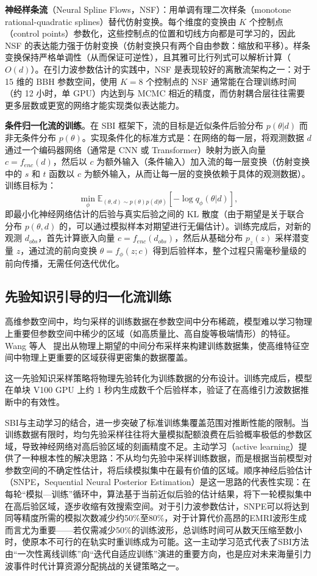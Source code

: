 \textbf{神经样条流}（Neural Spline Flows，NSF）：用单调有理二次样条（monotone rational-quadratic splines）替代仿射变换。每个维度的变换由 $K$ 个控制点（control points）参数化，这些控制点的位置和切线方向都是可学习的，因此 NSF 的表达能力强于仿射变换（仿射变换只有两个自由参数：缩放和平移）。样条变换保持严格单调性（从而保证可逆性），且其雅可比行列式可以解析计算（$O(d)$）。在引力波参数估计的实践中，NSF 是表现较好的离散流架构之一：对于 15 维的 BBH 参数空间，使用 $K = 8$ 个控制点的 NSF 通常能在合理训练时间（约 12 小时，单 GPU）内达到与 MCMC 相近的精度，而仿射耦合层往往需要更多层数或更宽的网络才能实现类似表达能力。

\textbf{条件归一化流的训练}。在 SBI 框架下，流的目标是近似条件后验分布 $p(\theta|d)$ 而非无条件分布 $p(\theta)$。实现条件化的标准方式是：在网络的每一层，将观测数据 $d$ 通过一个编码器网络（通常是 CNN 或 Transformer）映射为嵌入向量 $c = f_{enc}(d)$，然后以 $c$ 为额外输入（条件输入）加入流的每一层变换（仿射变换中的 $s$ 和 $t$ 函数以 $c$ 为额外输入，从而让每一层的变换依赖于具体的观测数据）。训练目标为：
\begin{equation}
  \min_\phi \mathbb{E}_{(\theta, d) \sim p(\theta)p(d|\theta)} [-\log q_\phi(\theta|d)],
\end{equation}
即最小化神经网络估计的后验与真实后验之间的 KL 散度（由于期望是关于联合分布 $p(\theta, d)$ 的，可以通过模拟样本对期望进行无偏估计）。训练完成后，对新的观测 $d_{obs}$，首先计算嵌入向量 $c = f_{enc}(d_{obs})$，然后从基础分布 $p_z(z)$ 采样潜变量 $z$，通过流的前向变换 $\theta = f_\phi(z; c)$ 得到后验样本，整个过程只需毫秒量级的前向传播，无需任何迭代优化。

\subsection{先验知识引导的归一化流训练}

高维参数空间中，均匀采样的训练数据在参数空间中分布稀疏，模型难以学习物理上重要但参数空间中稀少的区域（如高质量比、高自旋等极端情形）的特征。Wang 等人~\cite{wang2022normflow} 提出从物理上期望的中间分布采样来构建训练数据集，使高维特征空间中物理上更重要的区域获得更密集的数据覆盖。

这一先验知识采样策略将物理先验转化为训练数据的分布设计。训练完成后，模型在单块 V100 GPU 上约 1 秒内生成数千个后验样本，验证了在高维引力波数据推断中的有效性。

SBI与主动学习的结合，进一步突破了标准训练集覆盖范围对推断性能的限制。当训练数据有限时，均匀先验采样往往将大量模拟配额浪费在后验概率极低的参数区域，导致神经网络对高后验区域的刻画精度不足。主动学习（active learning）提供了一种根本性的解决思路：不从均匀先验中采样训练数据，而是根据当前模型对参数空间的不确定性估计，将后续模拟集中在最有价值的区域。顺序神经后验估计（SNPE，Sequential Neural Posterior Estimation）是这一思路的代表性实现：在每轮“模拟—训练”循环中，算法基于当前近似后验的估计结果，将下一轮模拟集中在高后验区域，逐步收缩有效搜索空间。对于引力波参数估计，SNPE可以将达到同等精度所需的模拟次数减少约50\%至80\%，对于计算代价高昂的EMRI波形生成而言尤为重要——若仅需减少50\%的训练波形，总训练时间可从数天压缩至数小时，使原本不可行的在轨实时重训练成为可能。这一主动学习范式代表了SBI方法由“一次性离线训练”向“迭代自适应训练”演进的重要方向，也是应对未来海量引力波事件时代计算资源分配挑战的关键策略之一。

